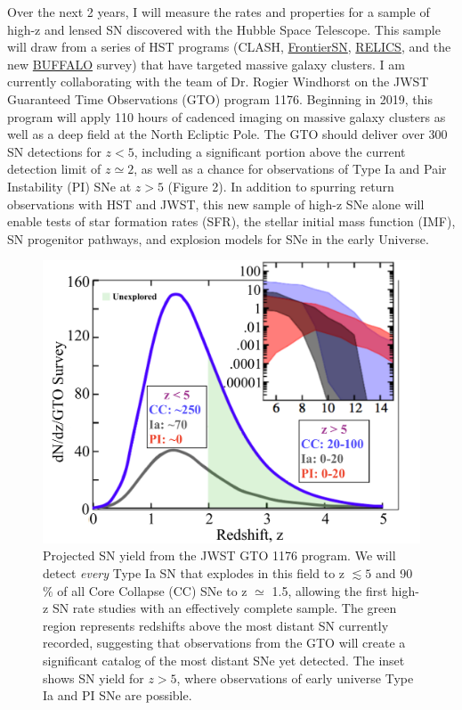 Over the next 2 years, I will measure the rates and properties for a
sample of high-z and lensed SN discovered with
the Hubble Space Telescope. This sample will draw from a series of HST programs (CLASH, \href{https://frontierfields.org}{FrontierSN}, \href{https://relics.stsci.edu/}{RELICS}, and the new \href{http://buffalo.ipac.caltech.edu/}{BUFFALO} survey) that have targeted massive galaxy clusters. I am currently collaborating with the team of
Dr. Rogier Windhorst on the JWST Guaranteed Time Observations (GTO)
program 1176. Beginning in 2019, this program will apply 110 hours of
cadenced imaging on massive galaxy clusters as well as a deep field at
the North Ecliptic Pole.  The GTO should deliver over 300 SN
detections for $z<5$, including a significant portion above the
current detection limit of $z\simeq2$, as well as a chance for
observations of Type Ia and Pair Instability (PI) SNe at $z>5$ (Figure
2). In addition to spurring return observations with HST and JWST,
this new sample of high-z SNe alone will enable tests of star
formation rates (SFR), the stellar initial mass function (IMF), SN
progenitor pathways, and explosion models for SNe in the early
Universe.
\begin{figure}
\centering
\includegraphics[height=.4\textwidth]{FIG/jwst_rates3}
\caption{
\noindent\fontsize{10}{14}\selectfont
Projected SN yield from the JWST GTO 1176 program. We will
detect \textit{every} Type Ia SN that explodes in this field to z
$\lesssim5$ and 90$\%$ of all Core Collapse (CC) SNe to z $\simeq$
1.5, allowing the first high-z SN rate studies with an effectively
complete sample. The green region represents redshifts above the most
distant SN currently recorded, suggesting that observations from the
GTO will create a significant catalog of the most distant SNe yet
detected. The inset shows SN yield for $z>5$, where observations of early universe
Type Ia and PI SNe are possible.}
\end{figure}

